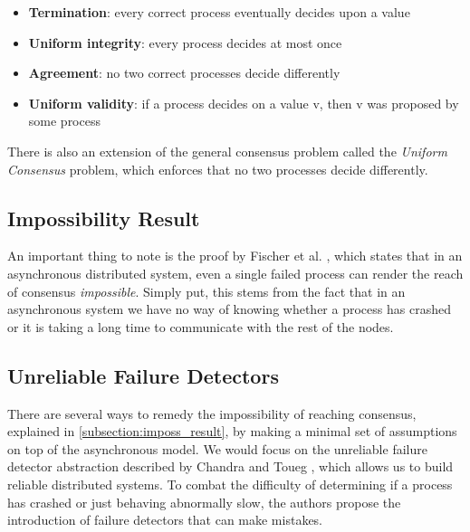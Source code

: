 \documentclass[bsc,frontabs,twoside,singlespacing,parskip,deptreport,hidel]{infthesis}     %
\begin{document}
\begin{itemize}
  \item \textbf{Termination}: every correct process eventually decides upon a value
  \item \textbf{Uniform integrity}: every process decides at most once
  \item \textbf{Agreement}: no two correct processes decide differently
  \item \textbf{Uniform validity}: if a process decides on a value v, then v was proposed by some process
\end{itemize}

There is also an extension of the general consensus problem called the \textit{Uniform Consensus} problem, which enforces that no two processes decide differently.

\subsection{Impossibility Result}
\label{subsection:imposs_result}
An important thing to note is the proof by Fischer et al. \cite{fischer1982impossibility}, which states that in an asynchronous distributed system, even a single failed process can render the reach of consensus \textit{impossible}. Simply put, this stems from the fact that in an asynchronous system we have no way of knowing whether a process has crashed or it is taking a long time to communicate with the rest of the nodes.


\subsection{Unreliable Failure Detectors}

There are several ways to remedy the impossibility of reaching consensus, explained in \autoref{subsection:imposs_result}, by making a minimal set of assumptions on top of the asynchronous model. We would focus on the unreliable failure detector abstraction described by Chandra and Toueg \cite{chandra1996unreliable}, which allows us to build reliable distributed systems. To combat the difficulty of determining if a process has crashed or just behaving abnormally slow, the authors propose the introduction of failure detectors that can make mistakes. 
\end{document}
